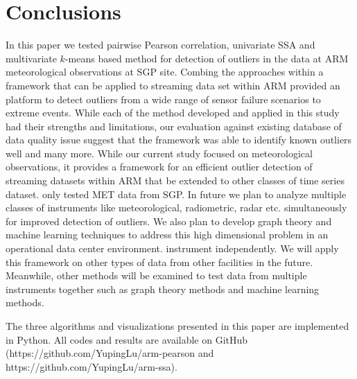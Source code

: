 \section{Conclusions}
In this paper we tested pairwise Pearson correlation,
univariate SSA and multivariate $k$-means based method for detection of
outliers in the data at ARM meteorological observations at SGP site. 
Combing the approaches within a framework that can be applied to
streaming data set within ARM provided an platform to detect outliers
from a wide range of sensor failure scenarios to extreme events.
While each of the method developed and applied in this study had their
strengths and limitations, our evaluation against existing database of
data quality issue suggest that the framework was able to identify known
outliers well and many more. While our current study focused on
meteorological observations, it provides a framework for an efficient
outlier detection of streaming datasets within ARM that be extended to
other classes of time series dataset.
only tested MET data from SGP. In future we plan to analyze multiple
classes of instruments like meteorological, radiometric, radar etc.
simultaneously for improved detection of outliers. We also plan to
develop graph theory and machine learning techniques to address this
high dimensional problem in an operational data center environment. 
instrument independently. We will apply this framework on other types
of data from other facilities in the future. Meanwhile, other methods
will be examined to test data from multiple instruments together such
as graph theory methods \cite{phillips2015graph} and machine learning
methods. 

The three algorithms and visualizations presented in this paper are 
implemented in Python. All codes and results are available on GitHub 
(https://github.com/YupingLu/arm-pearson and https://github.com/YupingLu/arm-ssa). 
